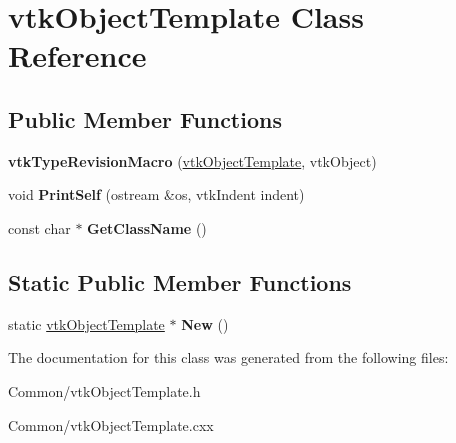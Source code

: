 \hypertarget{classvtkObjectTemplate}{
\section{vtkObjectTemplate Class Reference}
\label{classvtkObjectTemplate}
}
\subsection*{Public Member Functions}
\begin{DoxyCompactItemize}
\item 
\hypertarget{classvtkObjectTemplate_a1e7ecb73333dbe0b47a72740bd09b2fc}{
{\bfseries vtkTypeRevisionMacro} (\hyperlink{classvtkObjectTemplate}{vtkObjectTemplate}, vtkObject)}
\label{classvtkObjectTemplate_a1e7ecb73333dbe0b47a72740bd09b2fc}

\item 
\hypertarget{classvtkObjectTemplate_a6ec2d4152099d87ceaa9e45ef321a2e0}{
void {\bfseries PrintSelf} (ostream \&os, vtkIndent indent)}
\label{classvtkObjectTemplate_a6ec2d4152099d87ceaa9e45ef321a2e0}

\item 
\hypertarget{classvtkObjectTemplate_aabe26804a27907ae272f836b710d1e30}{
const char $\ast$ {\bfseries GetClassName} ()}
\label{classvtkObjectTemplate_aabe26804a27907ae272f836b710d1e30}

\end{DoxyCompactItemize}
\subsection*{Static Public Member Functions}
\begin{DoxyCompactItemize}
\item 
\hypertarget{classvtkObjectTemplate_a919e53dd17a49f16bf631a94bc55b91a}{
static \hyperlink{classvtkObjectTemplate}{vtkObjectTemplate} $\ast$ {\bfseries New} ()}
\label{classvtkObjectTemplate_a919e53dd17a49f16bf631a94bc55b91a}

\end{DoxyCompactItemize}


The documentation for this class was generated from the following files:\begin{DoxyCompactItemize}
\item 
Common/vtkObjectTemplate.h\item 
Common/vtkObjectTemplate.cxx\end{DoxyCompactItemize}
